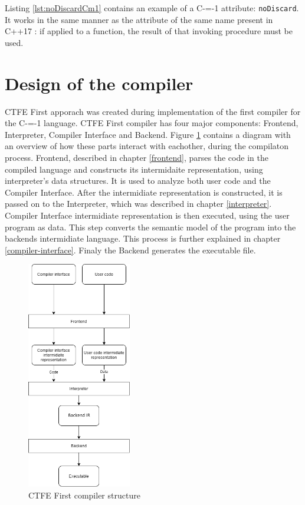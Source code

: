 Listing \ref{lst:noDiscardCm1} contains an example of a C-=-1 attribute: \lstinline{noDiscard}.
It works in the same manner as the attribute of the same name present in C++17 \cite{ISO:cpp17}: if applied to a function, the result of that invoking procedure must be used.

\section{Design of the compiler}
\label{compiler-design}

CTFE First apporach was created during implementation of the first compiler for the C-=-1 language\cite{grabski2022compilation}.
CTFE First compiler has four major components: Frontend, Interpreter, Compiler Interface and Backend.
Figure \ref{CTFE-first-compiler-structure} contains a diagram with an overview of how these parts interact with eachother, during the compilaton process.
Frontend, described in chapter \ref{frontend}, parses the code in the compiled language and constructs its intermidaite representation, using interpreter's data structures.
It is used to analyze both user code and the Compiler Interface.
After the intermidiate representation is constructed, it is passed on to the Interpreter, which was described in chapter \ref{interpreter}.
Compiler Interface intermidiate representation is then executed, using the user program as data.
This step converts the semantic model of the program into the backends intermidiate language.
This process is further explained in chapter \ref{compiler-interface}.
Finaly the Backend generates the executable file.

\begin{figure}
	\includegraphics[height=10cm]{pictures/compiler-structure.png}
	\caption{CTFE First compiler structure}
	\label{CTFE-first-compiler-structure}
\end{figure}

